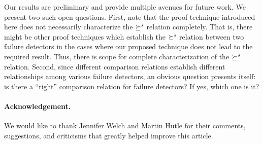 \documentclass[11pt]{article}
\newcommand{\ident}[1]{\textit{#1}\rule{0cm}{1ex}}
\newcommand{\redSolv}{\succeq^{\ident{s}}}
\begin{document}
Our results are preliminary and provide multiple avenues for future
     work.
We present two such open questions.
First, note that the proof technique introduced here does not
     necessarily characterize the $\redSolv$ relation completely.
That is, there might be other proof techniques which establish the
     $\redSolv$ relation between two failure detectors in the cases
     where our proposed technique does not lead to the required
     result.
Thus, there is scope for complete characterization of the $\redSolv$
     relation.
Second, since different comparison relations establish different
     relationships among various failure detectors, an obvious
     question presents itself: is there a ``right'' comparison
     relation for failure detectors? If yes, which one is it?

\paragraph{Acknowledgement.} We would like to thank Jennifer Welch and Martin Hutle for their comments, suggestions, and criticisms that greatly helped improve this article.


\end{document}
